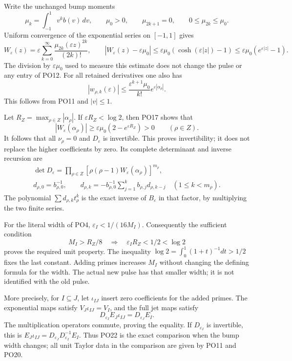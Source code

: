 Write the unchanged bump moments
\[
 \mu_k=\int_{-1}^1v^k b(v)\,dv,\qquad
 \mu_0>0,\qquad \mu_{2k+1}=0,\qquad 0\le\mu_{2k}\le\mu_0 .
 \tag{PO16}
\]
Uniform convergence of the exponential series on \([-1,1]\)
gives
\[
 W_\varepsilon(z)=\varepsilon\sum_{k=0}^\infty
              \frac{\mu_{2k}(\varepsilon z)^{2k}}{(2k)!},
 \qquad
 |W_\varepsilon(z)-\varepsilon\mu_0|
       \le\varepsilon\mu_0(\cosh(\varepsilon|z|)-1)
       \le\varepsilon\mu_0(e^{\varepsilon|z|}-1).
 \tag{PO17}\label{PO:po:unit-control}
\]
The division by \(\varepsilon\mu_0\) used to measure this estimate does
not change the pulse or any entry of PO12.
For all retained derivatives one also has
\[
 |w_{\rho,k}(\varepsilon)|
   \le\frac{\varepsilon^{k+1}\mu_0}{k!}e^{\varepsilon|\alpha_\rho|}.
 \tag{PO18}\label{PO:po:derivative-bound}
\]
This follows from PO11 and \(|v|\le1\).

Let \(R_Z=\max_{\rho\in Z}|\alpha_\rho|\).
If \(\varepsilon R_Z<\log2\), then PO17 shows that
\[
 |W_\varepsilon(\alpha_\rho)|
   \ge\varepsilon\mu_0(2-e^{\varepsilon R_Z})>0
                    \qquad(\rho\in Z).
 \tag{PO19}\label{PO:po:unit-criterion}
\]
It follows that all \(\nu_\rho=0\) and \(D_\varepsilon\) is invertible.
This proves invertibility; it does not replace the higher
coefficients by zero. Its complete determinant and inverse recursion are
\[
 \begin{gathered}
 \det D_\varepsilon=\prod_{\rho\in Z}
       [\rho(\rho-1)W_\varepsilon(\alpha_\rho)]^{m_\rho},\\
 d_{\rho,0}=b_{\rho,0}^{-1},\qquad
 d_{\rho,k}=-b_{\rho,0}^{-1}
                \sum_{j=1}^k b_{\rho,j}d_{\rho,k-j}
                   \quad(1\le k<m_\rho).
 \end{gathered}
 \tag{PO20}\label{PO:po:inverse}
\]
The polynomial \(\sum d_{\rho,k}t_\rho^k\) is the exact inverse
of \(B_\varepsilon\) in that factor, by multiplying the two finite series.

For the literal width of PO4,
\(\varepsilon_I<1/(16M_I)\). Consequently the sufficient condition
\[
 M_I>R_Z/8
 \quad\Longrightarrow\quad
 \varepsilon_I R_Z<1/2<\log2
 \tag{PO21}\label{PO:po:width}
\]
proves the required unit property. The inequality
\(\log2=\int_0^1(1+t)^{-1}dt>1/2\) fixes the last constant.
Adding primes increases \(M_I\) without changing the defining
formula for the width. The actual new pulse has that smaller
width; it is not identified with the old pulse.

More precisely, for \(I\subseteq J\), let
\(\iota_{IJ}\) insert zero coefficients for the added primes.
The exponential maps satisfy \(V_J\iota_{IJ}=V_I\), and the
full jet maps satisfy
\[
 D_{\varepsilon_I}E_J\iota_{IJ}=D_{\varepsilon_J}E_I.
 \tag{PO22}\label{PO:po:width-change}
\]
The multiplication operators commute, proving the equality.
If \(D_{\varepsilon_I}\) is invertible, this is
\(E_J\iota_{IJ}=D_{\varepsilon_J}D_{\varepsilon_I}^{-1}E_I\).
Thus PO22 is the exact comparison when the bump width changes;
all unit Taylor data in the comparison are given by PO11 and PO20.

